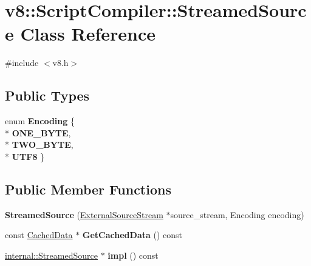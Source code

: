 \hypertarget{classv8_1_1_script_compiler_1_1_streamed_source}{}\section{v8\+:\+:Script\+Compiler\+:\+:Streamed\+Source Class Reference}
\label{classv8_1_1_script_compiler_1_1_streamed_source}


{\ttfamily \#include $<$v8.\+h$>$}

\subsection*{Public Types}
\begin{DoxyCompactItemize}
\item 
enum {\bfseries Encoding} \{ \\*
{\bfseries O\+N\+E\+\_\+\+B\+Y\+TE}, 
\\*
{\bfseries T\+W\+O\+\_\+\+B\+Y\+TE}, 
\\*
{\bfseries U\+T\+F8}
 \}\hypertarget{classv8_1_1_script_compiler_1_1_streamed_source_a17b52f85ac22120e687b16357d662da2}{}\label{classv8_1_1_script_compiler_1_1_streamed_source_a17b52f85ac22120e687b16357d662da2}

\end{DoxyCompactItemize}
\subsection*{Public Member Functions}
\begin{DoxyCompactItemize}
\item 
{\bfseries Streamed\+Source} (\hyperlink{classv8_1_1_script_compiler_1_1_external_source_stream}{External\+Source\+Stream} $\ast$source\+\_\+stream, Encoding encoding)\hypertarget{classv8_1_1_script_compiler_1_1_streamed_source_a4da404a49e48a12927c743797833d8aa}{}\label{classv8_1_1_script_compiler_1_1_streamed_source_a4da404a49e48a12927c743797833d8aa}

\item 
const \hyperlink{structv8_1_1_script_compiler_1_1_cached_data}{Cached\+Data} $\ast$ {\bfseries Get\+Cached\+Data} () const \hypertarget{classv8_1_1_script_compiler_1_1_streamed_source_a8d0405729e50d5dbecbe1b25ad7fbef0}{}\label{classv8_1_1_script_compiler_1_1_streamed_source_a8d0405729e50d5dbecbe1b25ad7fbef0}

\item 
\hyperlink{structv8_1_1internal_1_1_streamed_source}{internal\+::\+Streamed\+Source} $\ast$ {\bfseries impl} () const \hypertarget{classv8_1_1_script_compiler_1_1_streamed_source_a60c3aa01ea04a6cd1aa1b7a5edb74c2b}{}\label{classv8_1_1_script_compiler_1_1_streamed_source_a60c3aa01ea04a6cd1aa1b7a5edb74c2b}

\end{DoxyCompactItemize}
